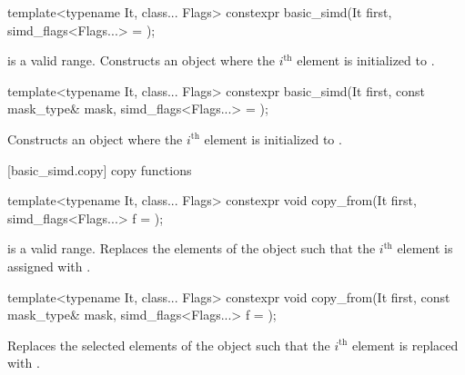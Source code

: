 \begin{itemdecl}
template<typename It, class... Flags>
  constexpr basic_simd(It first, simd_flags<Flags...> = {});
\end{itemdecl}

\begin{itemdescr}
  \SimdLoadDescr
    {\tcode{[first, first + size())} is a valid range.}
    {Constructs an object where the $i^\text{th}$ element is initialized to  \foralli.}
\end{itemdescr}

\begin{itemdecl}
template<typename It, class... Flags>
  constexpr basic_simd(It first, const mask_type& mask, simd_flags<Flags...> = {});
\end{itemdecl}

\begin{itemdescr}
  \SimdLoadDescr
    {\validMaskedRange}
    {Constructs an object where the $i^\text{th}$ element is initialized to  \foralli.}
\end{itemdescr}

[basic_simd.copy]{ copy functions}

\begin{itemdecl}
template<typename It, class... Flags>
  constexpr void copy_from(It first, simd_flags<Flags...> f = {});
\end{itemdecl}

\begin{itemdescr}
  \SimdLoadDescr
    {\tcode{[first, first + size())} is a valid range.}
    {Replaces the elements of the  object such that the $i^\text{th}$ element is assigned with  \foralli.}
\end{itemdescr}

\begin{itemdecl}
template<typename It, class... Flags>
  constexpr void copy_from(It first, const mask_type& mask, simd_flags<Flags...> f = {});
\end{itemdecl}

\begin{itemdescr}
  \SimdLoadDescr
    {\validMaskedRange}
    {Replaces the selected elements of the  object such that the $i^\text{th}$ element is replaced with  \forallmaskedi.}
\end{itemdescr}

